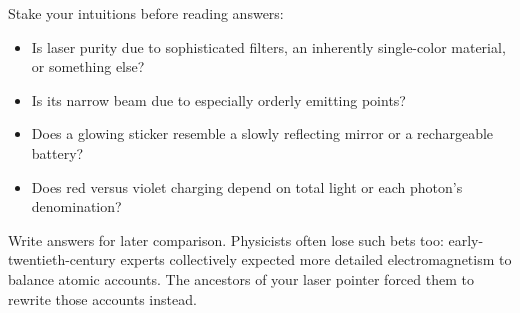 \begin{mainline}
Stake your intuitions before reading answers:

\begin{itemize}[leftmargin=1.8em]
  \item Is laser purity due to sophisticated filters, an inherently single-color material, or something else?
  \item Is its narrow beam due to especially orderly emitting points?
  \item Does a glowing sticker resemble a slowly reflecting mirror or a rechargeable battery?
  \item Does red versus violet charging depend on total light or each photon's denomination?
\end{itemize}

Write answers for later comparison. Physicists often lose such bets too: early-twentieth-century experts collectively expected more detailed electromagnetism to balance atomic accounts. The ancestors of your laser pointer forced them to rewrite those accounts instead.
\end{mainline}



